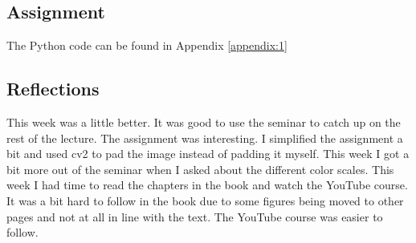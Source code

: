 \documentclass{article}
\begin{document}
    \subsection{Assignment}
    The Python code can be found in Appendix \ref{appendix:1}
    \subsection{Reflections}
    This week was a little better. It was good to use the seminar to catch up on the rest
    of the lecture. The assignment was interesting. I simplified the assignment a bit and used cv2 to pad the image
    instead of padding it myself. This week I got a bit more out of the seminar when I asked about the different color scales.
    This week I had time to read the chapters in the book and watch the YouTube course. It was a bit hard to
    follow in the book due to some figures being moved to other pages and not at all in line with the text.
    The YouTube course was easier to follow.
\end{document}
